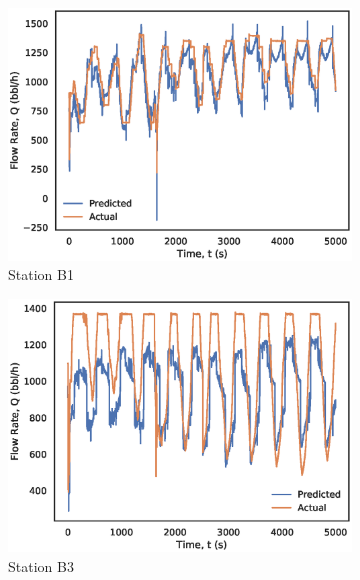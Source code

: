 \begin{figure}
    \centering
    \begin{subfigure}[b]{0.325\textwidth}
         \centering
         \includegraphics[width=\textwidth]{images/suncor/08Chey_Pconst.eps}
         \caption{Station B1}
         \label{fig:08Chey_Pconst}
    \end{subfigure}
    \begin{subfigure}[b]{0.325\textwidth}
         \centering
         \includegraphics[width=\textwidth]{images/suncor/08Ault_Pconst.eps}
         \caption{Station B3}
         \label{fig:08Station B3_Pconst}
    \end{subfigure}
    \begin{subfigure}[b]{0.325\textwidth}
         \centering

\end{subfigure}
\end{figure}
